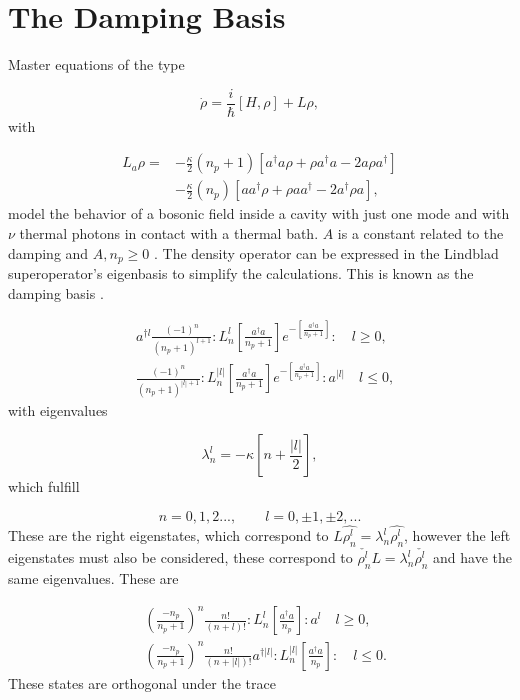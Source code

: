 \documentclass[reprint, amsmath,amssymb, aps,pra]{revtex4-1}
\begin{document}
\appendix

\section{The Damping Basis}\label{App1}

Master equations of the type 

\begin{equation}
\dot{\rho} = \frac{i}{\hbar}[H,\rho]+L\rho, 
\end{equation} with

\begin{align}\label{EMField}
L_a \rho =& - \frac{\kappa}{2}(n_p+1)[a^\dagger a\rho + \rho a^\dagger a -2a\rho a^\dagger] \nonumber \\
 &- \frac{\kappa}{2}(n_p)[ aa^\dagger\rho + \rho  aa^\dagger -2a^\dagger\rho a],
\end{align} model the behavior of a bosonic field inside a cavity with just one mode and with $\nu$ thermal photons in contact with a thermal bath. $A$ is a constant related to the damping and $A,n_p \geq 0$  \cite{EnglertDB}. The density operator can be expressed in the Lindblad superoperator's eigenbasis to simplify the calculations. This is known as the damping basis \cite{EnglertDB}.

\begin{align}\label{DefDB}
&a^{\dagger l}\frac{(-1)^n}{(n_p+1)^{l+1}}:L_n^l[\frac{a^\dagger a}{n_p+1}]e^{-[\frac{a^\dagger a}{n_p+1}]}:\quad l \geq 0, \\
&\frac{(-1)^n}{(n_p+1)^{|l|+1}}:L_n^{|l|}[\frac{a^\dagger a}{n_p+1}]e^{-[\frac{a^\dagger a}{n_p+1}]}:a^{|l|}\quad l \leq 0,
\end{align} with eigenvalues

\begin{equation}
\lambda_n^l = -\kappa[n + \frac{|l|}{2}],
\end{equation} which fulfill

\begin{equation}
n=0,1,2...,\qquad l = 0,\pm 1, \pm 2,... 
\end{equation} These are the right eigenstates, which correspond to $L\hat{\rho_n^l} = \lambda_n^l\hat{\rho_n^l}$, however the left eigenstates must also be considered, these correspond to $\check{\rho_n^l}L = \lambda_n^l\check{\rho_n^l}$ and have the same eigenvalues. These are

\begin{align}\label{DefDBDual}
&(\frac{-n_p}{n_p+1})^n\frac{n!}{(n+l)!}:L_n^l[\frac{a^\dagger a}{n_p}]:a^{l}\quad l \geq 0, \\
&(\frac{-n_p}{n_p+1})^n\frac{n!}{(n+|l|)!}a^{\dagger|l|}:L_n^{|l|}[\frac{a^\dagger a}{n_p}]:\quad l \leq 0.
\end{align} These states are orthogonal under the trace
\end{document}
